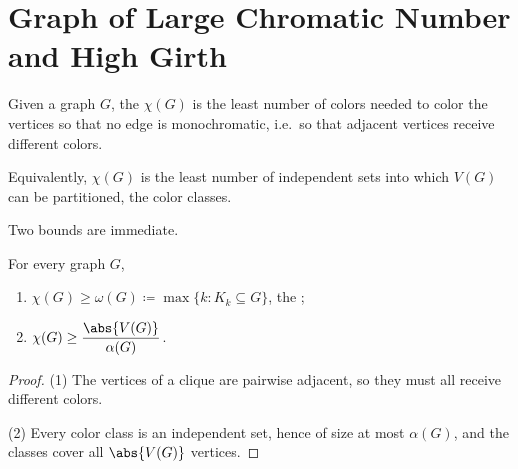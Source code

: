 \section{Graph of Large Chromatic Number and High Girth}\label{sec:chromatic}

\begin{definition}\label{def:chromatic}
    Given a graph \(G\), the  \(\chi(G)\) is the least number of colors needed to color the vertices so that no edge is monochromatic, i.e.\ so that adjacent vertices receive different colors.
\end{definition}

Equivalently, \(\chi(G)\) is the least number of independent sets into which \(V(G)\) can be partitioned, the color classes.
\begin{center}
\end{center}

Two bounds are immediate.

\begin{proposition}\label{prop:chromatic-bounds}
    For every graph \(G\),
    \begin{enumerate}[(1)]
        \item \(\chi(G) \ge \omega(G) \coloneqq \max\{ k : K_k \subseteq G \}\), the ;
        \item \(\chi(G) \ge \dfrac{\abs{V(G)}}{\alpha(G)}\).
    \end{enumerate}
\end{proposition}

\begin{proof}
    (1) The vertices of a clique are pairwise adjacent, so they must all receive different colors.

    (2) Every color class is an independent set, hence of size at most \(\alpha(G)\), and the classes cover all \(\abs{V(G)}\) vertices.
\end{proof}

